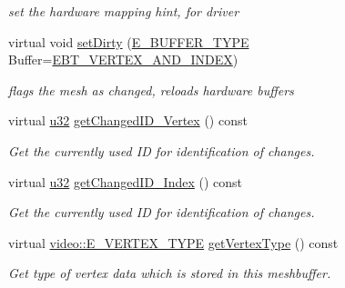 \begin{DoxyCompactItemize}
\begin{DoxyCompactList}\small\item\em set the hardware mapping hint, for driver \end{DoxyCompactList}\item 
\mbox{\label{classirr_1_1scene_1_1IDynamicMeshBuffer_aed99e87534a2507c30362a20f4c43277}} 
virtual void \hyperlink{classirr_1_1scene_1_1IDynamicMeshBuffer_aed99e87534a2507c30362a20f4c43277}{set\+Dirty} (\hyperlink{namespaceirr_1_1scene_a8f59a89ffef0ad8e5b2c2cb874a93e8c}{E\+\_\+\+B\+U\+F\+F\+E\+R\+\_\+\+T\+Y\+PE} Buffer=\hyperlink{namespaceirr_1_1scene_a8f59a89ffef0ad8e5b2c2cb874a93e8ca34ea664123fbc28610408e51b014dcdd}{E\+B\+T\+\_\+\+V\+E\+R\+T\+E\+X\+\_\+\+A\+N\+D\+\_\+\+I\+N\+D\+EX})
\begin{DoxyCompactList}\small\item\em flags the mesh as changed, reloads hardware buffers \end{DoxyCompactList}\item 
virtual \hyperlink{namespaceirr_a0416a53257075833e7002efd0a18e804}{u32} \hyperlink{classirr_1_1scene_1_1IDynamicMeshBuffer_a3480aae22a6701453a19b4c4cbcf2555}{get\+Changed\+I\+D\+\_\+\+Vertex} () const
\begin{DoxyCompactList}\small\item\em Get the currently used ID for identification of changes. \end{DoxyCompactList}\item 
virtual \hyperlink{namespaceirr_a0416a53257075833e7002efd0a18e804}{u32} \hyperlink{classirr_1_1scene_1_1IDynamicMeshBuffer_a2514a3d0e4865b7b9714fe1f9f58ad51}{get\+Changed\+I\+D\+\_\+\+Index} () const
\begin{DoxyCompactList}\small\item\em Get the currently used ID for identification of changes. \end{DoxyCompactList}\item 
virtual \hyperlink{namespaceirr_1_1video_a0e3b59e025e0d0db0ed2ee0ce904deac}{video\+::\+E\+\_\+\+V\+E\+R\+T\+E\+X\+\_\+\+T\+Y\+PE} \hyperlink{classirr_1_1scene_1_1IDynamicMeshBuffer_a3e7523774efaf9a177de6396dfdc14e2}{get\+Vertex\+Type} () const
\begin{DoxyCompactList}\small\item\em Get type of vertex data which is stored in this meshbuffer. \end{DoxyCompactList}\item 

\end{DoxyCompactItemize}
